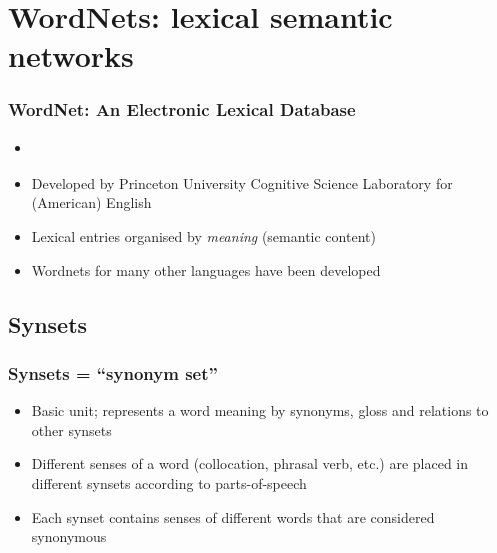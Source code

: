 \section{WordNets: lexical semantic networks}

\newcommand{\mysynset}[1]{\text{(#1)}}
\newcommand{\myrel}[1]{\text{\emph{\color{purple}#1}}}
\newcommand{\myword}[1]{\text{`#1'}}
\newcommand{\myconcept}[1]{\text{\scshape #1}}
\newcommand{\myinst}[1]{\text{\scshape\color{green!30!black} #1}}

\begin{frame}
\frametitle{WordNet: An Electronic Lexical Database}

\begin{itemize}
\item \parencite{miller:wordnet:1995}
\item Developed by Princeton University Cognitive Science Laboratory for (American) English
\item Lexical entries organised by \emph{meaning} (semantic content)
\item Wordnets for many other languages have been developed
\end{itemize}
\end{frame}

\subsection{Synsets}
\begin{frame}
\frametitle{Synsets = ``synonym set''}
\begin{itemize}
\item Basic unit; represents a word meaning by \alert{synonyms}, \alert{gloss} and \alert{relations to other synsets}
\item Different senses of a word (collocation, phrasal verb, etc.) are placed in different synsets according to parts-of-speech
\item Each synset contains senses of different words that are considered synonymous
\end{itemize}
\end{frame}

